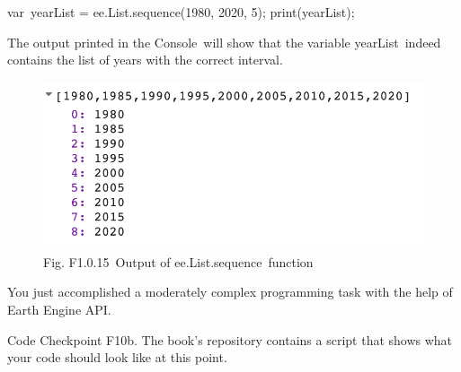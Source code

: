 \documentclass[
  letterpaper,
  DIV=11,
  numbers=noendperiod]{scrreprt}
\newenvironment{Shaded}{\begin{snugshade}}{\end{snugshade}}
\newcommand{\AttributeTok}[1]{\textcolor[rgb]{0.40,0.45,0.13}{#1}}
\newcommand{\DecValTok}[1]{\textcolor[rgb]{0.68,0.00,0.00}{#1}}
\newcommand{\FunctionTok}[1]{\textcolor[rgb]{0.28,0.35,0.67}{#1}}
\newcommand{\NormalTok}[1]{\textcolor[rgb]{0.00,0.23,0.31}{#1}}
\newcommand{\OperatorTok}[1]{\textcolor[rgb]{0.37,0.37,0.37}{#1}}
\begin{document}
\begin{Shaded}
\begin{Highlighting}[]
\NormalTok{var yearList }\OperatorTok{=}\NormalTok{ ee}\OperatorTok{.}\AttributeTok{List}\OperatorTok{.}\FunctionTok{sequence}\NormalTok{(}\DecValTok{1980}\OperatorTok{,} \DecValTok{2020}\OperatorTok{,} \DecValTok{5}\NormalTok{)}\OperatorTok{;}  
\FunctionTok{print}\NormalTok{(yearList)}\OperatorTok{;}
\end{Highlighting}
\end{Shaded}

The output printed in the Console~will show that the variable
yearList~indeed contains the list of years with the correct interval.

\begin{figure}

{\centering \includegraphics{./F1/image29.png}

}

\caption{Fig. F1.0.15~Output of ee.List.sequence~function}

\end{figure}

You just accomplished a moderately complex programming task with the
help of Earth Engine API.

\begin{tcolorbox}[enhanced jigsaw, left=2mm, breakable, rightrule=.15mm, opacityback=0, colframe=quarto-callout-note-color-frame, colbacktitle=quarto-callout-note-color!10!white, arc=.35mm, opacitybacktitle=0.6, toptitle=1mm, colback=white, leftrule=.75mm, title=\textcolor{quarto-callout-note-color}{\faInfo}\hspace{0.5em}{Note}, toprule=.15mm, bottomtitle=1mm, titlerule=0mm, bottomrule=.15mm, coltitle=black]

Code Checkpoint F10b. The book's repository contains a script that shows
what your code should look like at this point.

\end{tcolorbox}
\end{document}
